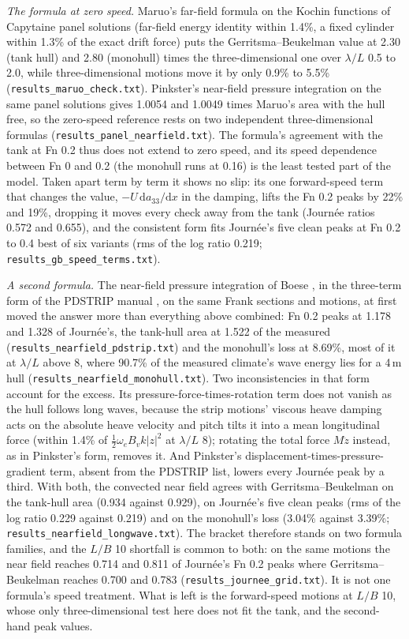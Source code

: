 \documentclass[conference]{IEEEtran}
\begin{document}
\emph{The formula at zero speed.} Maruo's far-field formula \cite{maruo1960drift} on the Kochin functions of Capytaine panel solutions (far-field energy identity within 1.4\%, a fixed cylinder within 1.3\% of the exact drift force) puts the Gerritsma--Beukelman value at 2.30 (tank hull) and 2.80 (monohull) times the three-dimensional one over $\lambda/L$ 0.5 to 2.0, while three-dimensional motions move it by only 0.9\% to 5.5\% (\texttt{results\_maruo\_check.txt}). Pinkster's near-field pressure integration \cite{pinkster1980low} on the same panel solutions gives 1.0054 and 1.0049 times Maruo's area with the hull free, so the zero-speed reference rests on two independent three-dimensional formulas (\texttt{results\_panel\_nearfield.txt}). The formula's agreement with the tank at Fn 0.2 thus does not extend to zero speed, and its speed dependence between Fn 0 and 0.2 (the monohull runs at 0.16) is the least tested part of the model. Taken apart term by term it shows no slip: its one forward-speed term that changes the value, $-U\,\mathrm{d}a_{33}/\mathrm{d}x$ in the damping, lifts the Fn 0.2 peaks by 22\% and 19\%, dropping it moves every check away from the tank (Journ\'ee ratios 0.572 and 0.655), and the consistent form fits Journ\'ee's five clean peaks at Fn 0.2 to 0.4 best of six variants (rms of the log ratio 0.219; \texttt{results\_gb\_speed\_terms.txt}).

\emph{A second formula.} The near-field pressure integration of Boese \cite{boese1970einfache}, in the three-term form of the PDSTRIP manual \cite{soeding2009pdstrip}, on the same Frank sections and motions, at first moved the answer more than everything above combined: Fn 0.2 peaks at 1.178 and 1.328 of Journ\'ee's, the tank-hull area at 1.522 of the measured (\texttt{results\_nearfield\_pdstrip.txt}) and the monohull's loss at 8.69\%, most of it at $\lambda/L$ above 8, where 90.7\% of the measured climate's wave energy lies for a 4\,m hull (\texttt{results\_nearfield\_monohull.txt}). Two inconsistencies in that form account for the excess. Its pressure-force-times-rotation term does not vanish as the hull follows long waves, because the strip motions' viscous heave damping acts on the absolute heave velocity and pitch tilts it into a mean longitudinal force (within 1.4\% of $\frac12\omega_e B_v k|z|^2$ at $\lambda/L$ 8); rotating the total force $M\ddot z$ instead, as in Pinkster's form, removes it. And Pinkster's displacement-times-pressure-gradient term, absent from the PDSTRIP list, lowers every Journ\'ee peak by a third. With both, the convected near field agrees with Gerritsma--Beukelman on the tank-hull area (0.934 against 0.929), on Journ\'ee's five clean peaks (rms of the log ratio 0.229 against 0.219) and on the monohull's loss (3.04\% against 3.39\%; \texttt{results\_nearfield\_longwave.txt}). The bracket therefore stands on two formula families, and the $L/B$ 10 shortfall is common to both: on the same motions the near field reaches 0.714 and 0.811 of Journ\'ee's Fn 0.2 peaks where Gerritsma--Beukelman reaches 0.700 and 0.783 (\texttt{results\_journee\_grid.txt}). It is not one formula's speed treatment. What is left is the forward-speed motions at $L/B$ 10, whose only three-dimensional test here does not fit the tank, and the second-hand peak values.
\end{document}
